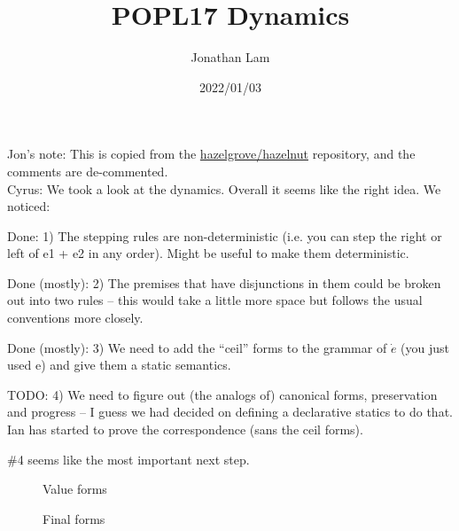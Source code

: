 \documentclass{article}
\title{POPL17 Dynamics}
\author{Jonathan Lam}
\date{2022/01/03}
\begin{document}
\maketitle{}

Jon's note: This is copied from the \href{https://github.com/hazelgrove/hazelnut-popl17}{hazelgrove/hazelnut} repository, and the comments are de-commented.\\

Cyrus: We took a look at the dynamics. Overall it seems like the
right idea. We noticed:

Done: 1) The stepping rules are non-deterministic (i.e. you can
step the right or left of e1 + e2 in any order). Might be useful to
make them deterministic.

Done (mostly): 2) The premises that have disjunctions in them could
be broken out into two rules -- this would take a little more space
but follows the usual conventions more closely.

Done (mostly): 3) We need to add the ``ceil'' forms to the grammar
of $\dot{e}$ (you just used e) and give them a static semantics.

TODO: 4) We need to figure out (the analogs of) canonical forms,
preservation and progress -- I guess we had decided on defining a
declarative statics to do that. Ian has started to prove the
correspondence (sans the ceil forms).

\#4 seems like the most important next step.

\begin{figure}[htbp]
  \centering

  
  \caption{Value forms}
  \label{fig:judg-value}
\end{figure}

\begin{figure}[htbp]
  \centering

  
  \caption{Final forms}
  \label{fig:judg-value}
\end{figure}
\end{document}

